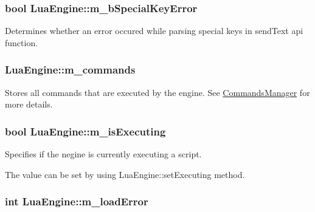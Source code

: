 \hypertarget{class_lua_engine_a5cac380e1359eb5a6cf95239e4ad2b19}{
\subsubsection[{m\-\_\-b\-Special\-Key\-Error}]{\setlength{\rightskip}{0pt plus 5cm}bool Lua\-Engine\-::m\-\_\-b\-Special\-Key\-Error\hspace{0.3cm}{\ttfamily [private]}}}\label{class_lua_engine_a5cac380e1359eb5a6cf95239e4ad2b19}


Determines whether an error occured while parsing special keys in send\-Text api function. 

\hypertarget{class_lua_engine_a86a3f32127e36e1ccce6c5a42a298ad5}{
\subsubsection[{m\-\_\-commands}]{ Lua\-Engine\-::m\-\_\-commands\hspace{0.3cm}{\ttfamily [private]}}}\label{class_lua_engine_a86a3f32127e36e1ccce6c5a42a298ad5}


Stores all commands that are executed by the engine. See \hyperlink{class_commands_manager}{Commands\-Manager} for more details. 

\hypertarget{class_lua_engine_ad2bf267f4030d958e5a6f88a3a19e039}{
\subsubsection[{m\-\_\-is\-Executing}]{\setlength{\rightskip}{0pt plus 5cm}bool Lua\-Engine\-::m\-\_\-is\-Executing\hspace{0.3cm}{\ttfamily [private]}}}\label{class_lua_engine_ad2bf267f4030d958e5a6f88a3a19e039}


Specifies if the negine is currently executing a script. 

The value can be set by using Lua\-Engine\-::set\-Executing method. \hypertarget{class_lua_engine_af8dca74620280060399b5b7dd937af44}{
\subsubsection[{m\-\_\-load\-Error}]{\setlength{\rightskip}{0pt plus 5cm}int Lua\-Engine\-::m\-\_\-load\-Error\hspace{0.3cm}{\ttfamily [private]}}}\label{class_lua_engine_af8dca74620280060399b5b7dd937af44}



